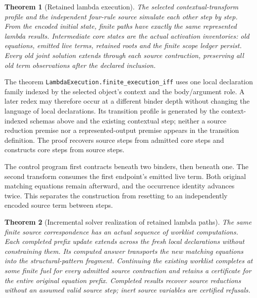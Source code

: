 \documentclass[11pt]{article}
\newtheorem{theorem}{Theorem}
\newcommand{\code}[1]{\texttt{\small #1}}
\begin{document}
\begin{theorem}[Retained lambda execution]
The selected contextual-transform profile and the independent four-rule
source simulate each other step by step. From the encoded initial state,
finite paths have exactly the same represented lambda results. Intermediate
core states are the actual activation inventories: old equations, emitted
live terms, retained roots and the finite scope ledger persist. Every old
joint solution extends through each source contraction, preserving all old
term observations after the declared inclusion.
\end{theorem}

The theorem \code{LambdaExecution.finite\_execution\_iff} uses one local
declaration family indexed by the selected object's context and the
body/argument role. A later redex may therefore occur at a different binder
depth without changing the language of local declarations. Its transition
profile is generated by the context-indexed schemas above and the existing
contextual step; neither a source reduction premise nor a represented-output
premise appears in the transition definition. The proof recovers source
steps from admitted core steps and constructs core steps from source steps.

The control program first contracts beneath two binders, then beneath one.
The second transform consumes the first endpoint's emitted live term.
Both original matching equations remain afterward, and the occurrence
identity advances twice. This separates the construction from resetting to
an independently encoded source term between steps.

\begin{theorem}[Incremental solver realization of retained lambda paths]
The same finite source correspondence has an actual sequence of worklist
computations. Each completed prefix update extends across the fresh local
declarations without constraining them. Its computed answer transports the
new matching equations into the structural-pattern fragment. Continuing
the existing worklist completes at some finite fuel for every admitted
source contraction and retains a certificate for the entire original
equation prefix. Completed results recover source reductions without an
assumed valid source step; inert source variables are certified refusals.
\end{theorem}
\end{document}
